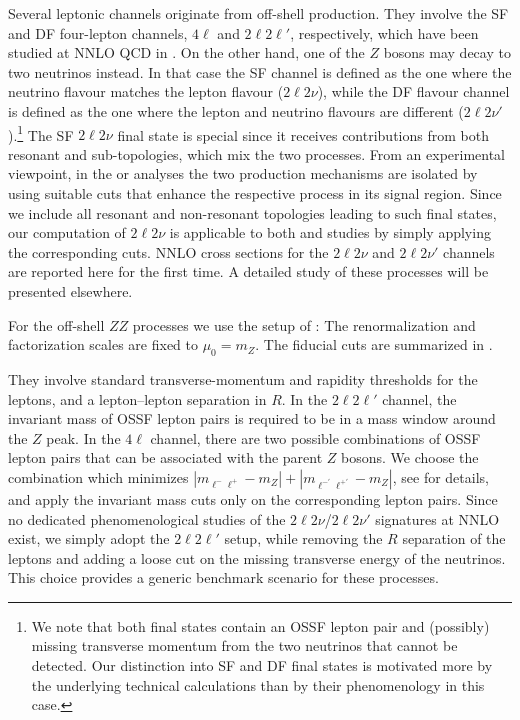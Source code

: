 \documentclass[english,11pt]{article}
\begin{document}
Several leptonic channels originate from off-shell \zz{} production. 
They involve the SF and DF four-lepton channels, $4\ell$ and $2\ell2\ell'$, respectively,
which have been studied at NNLO QCD in .
On the other hand, one of the $Z$ bosons may decay to two neutrinos instead. 
In that case the SF channel is defined as the one where 
the neutrino flavour matches the lepton flavour ($2\ell2\nu$), while the 
DF flavour channel is defined as the one where the lepton and neutrino
flavours are different ($2\ell2\nu'$).\footnote{We note that both final states contain
an OSSF lepton pair and (possibly) missing transverse momentum from the 
two neutrinos that cannot be detected. Our distinction into SF and DF final states
is motivated more by the underlying technical calculations than by their phenomenology
in this case.}
The SF $2\ell2\nu$ final state is special since 
it receives contributions from both resonant \zz{} and \ww{} sub-topologies, 
which mix the two processes. 
From an experimental viewpoint, in the \zz{} or \ww{} analyses the two production mechanisms  
are isolated by using suitable cuts that enhance the 
respective process in its signal region. Since we include all resonant and 
non-resonant topologies leading to such final states, our computation 
of $2\ell2\nu$ is applicable to both \zz{} and \ww{} studies
by simply applying the corresponding cuts.
NNLO cross sections for the $2\ell2\nu$ and $2\ell2\nu'$ channels 
are reported here for the first time. A detailed study of these processes 
will be presented elsewhere.

For the off-shell $ZZ$ processes we use the setup of : 
The renormalization and factorization scales are fixed to $\mu_0=m_Z$. 
The fiducial cuts are summarized in . 
%

%
They involve standard 
transverse-momentum and rapidity thresholds for the leptons,
and a lepton--lepton separation in $R$.
In the $2\ell2\ell'$ channel, the invariant mass of OSSF lepton pairs is required to be
in a mass window around the $Z$ peak. In the 
$4\ell$ channel, there are two possible combinations of OSSF lepton pairs that 
can be associated with the parent $Z$ bosons. We choose the combination 
which minimizes 
$\left| m_{\ell^-\ell^+}-m_Z\right|+\left|m_{\ell^{-\prime}\ell^{+\prime}}-m_Z\right|$, see  for details,
and apply the invariant mass cuts only on the corresponding 
lepton pairs. Since no dedicated phenomenological studies of
the $2\ell2\nu$/$2\ell2\nu'$
signatures at NNLO exist, we simply adopt
the $2\ell2\ell'$ setup, while removing the $R$ separation of the leptons and adding 
a loose cut on the missing transverse energy of the neutrinos. This choice provides 
a generic benchmark scenario for these processes.
\end{document}
